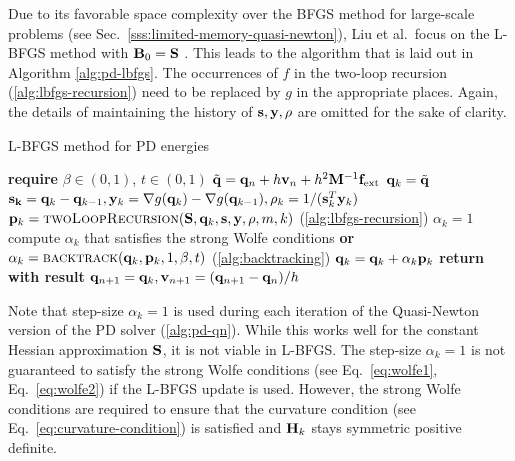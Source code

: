 Due to its favorable space complexity over the BFGS method for large-scale problems (see Sec.\ \ref{sss:limited-memory-quasi-newton}), 
Liu et al.\ focus on the L-BFGS method with $\mathbf{B}_0 = \mathbf{S}$ \cite{liu2017}. This leads to the algorithm that is laid out in
Algorithm \ref{alg:pd-lbfgs}. The occurrences of $f$ in the two-loop recursion (\cref{alg:lbfgs-recursion}) need to be replaced by $g$ 
in the appropriate places. Again, the details of maintaining the history of $\mathbf{s}, \mathbf{y}, \rho$ are omitted for the sake of clarity.

\begin{algorithm}
\caption{L-BFGS method for PD energies}\label{alg:pd-lbfgs}
\begin{algorithmic}[1]
\State \textbf{require } $\beta \in (0, 1)$, $t \in (0, 1)$
\State $\tilde{\mathbf{q}} = \mathbf{q}_n + h\mathbf{v}_n + h^2\mathbf{M}^{-1}\mathbf{f}_{\text{ext}}$
\State $\mathbf{q}_k = \tilde{\mathbf{q}}$
\State $\mathbf{s_k} = \mathbf{q}_k - \mathbf{q}_{k-1}, \mathbf{y}_k = \nabla g(\mathbf{q}_k) - \nabla g(\mathbf{q}_{k-1}), \rho_k = 1 / (\mathbf{s}^T_k \mathbf{y}_k)$
\State $\mathbf{p}_k = \text{\textsc{twoLoopRecursion}}(\mathbf{S}, \mathbf{q}_k, \mathbf{s}, \mathbf{y}, \rho, m, k)$   (\cref{alg:lbfgs-recursion})
\State $\alpha_k = 1$
\State compute $\alpha_k$ that satisfies the strong Wolfe conditions 
\State \textbf{or} $\alpha_k = \text{\textsc{backtrack}}(\mathbf{q}_k, \mathbf{p}_k, 1, \beta, t)$ (\cref{alg:backtracking})
\EndIf
\State $\mathbf{q}_k = \mathbf{q}_k + \alpha_k \mathbf{p}_k$
\EndFor
\State \textbf{return with result } $\mathbf{q}_{n+1} = \mathbf{q}_k, \mathbf{v}_{n+1} = (\mathbf{q}_{n+1} - \mathbf{q}_n)/h$
\EndProcedure
\end{algorithmic}
\end{algorithm}

Note that step-size $\alpha_k = 1$ is 
used during each iteration of the Quasi-Newton version of the PD solver (\cref{alg:pd-qn}).
While this works well for the constant Hessian approximation $\mathbf{S}$, it is not viable in L-BFGS. The step-size $\alpha_k = 1$
is not guaranteed to satisfy the strong Wolfe conditions (see Eq.\ \ref{eq:wolfe1}, Eq.\ \ref{eq:wolfe2}) if the L-BFGS update is used. However,
the strong Wolfe conditions are required to ensure that the curvature condition (see Eq.\ \ref{eq:curvature-condition}) is satisfied 
and $\mathbf{H}_k$ stays symmetric positive definite. 


